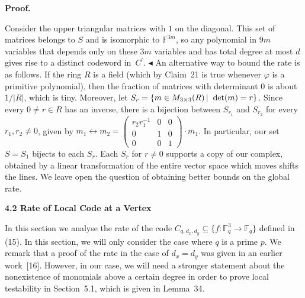 \documentclass[10pt,a4paper]{article}
\begin{document}



\par\medskip\noindent\textbf{Proof.}\par




Consider the upper triangular matrices with $1$ on the diagonal. This set of matrices belongs to $S$ and is isomorphic to $\mathbb{F}^{3m}$, so any polynomial in $9m$ variables that depends only on these $3m$ variables and has total degree at most $d$ gives rise to a distinct codeword in $C^{\prime}$.
$\blacktriangleleft$
An alternative way to bound the rate is as follows. If the ring $R$ is a field (which by Claim 21 is true whenever $\varphi$ is a primitive polynomial), then the fraction of matrices with determinant $0$ is about $1/|R|$, which is tiny. Moreover, let
$S_{r}=\left\{m\in M_{3\times 3}(R)\left|\;\vphantom{m\in M_{3\times 3}(R)\det(m)=r}\right.\det(m)=r\right\}$.
Since every $0\neq r\in R$ has an inverse, there is a bijection between $S_{r_{1}}$ and $S_{r_{2}}$ for every $r_{1},r_{2}\neq 0$, given by $m_{1}\leftrightarrow m_{2}=\begin{pmatrix}r_{2}r_{1}^{-1}&0&0\\
0&1&0\\
0&0&1\end{pmatrix}\cdot m_{1}$. In particular, our set $S=S_{1}$ bijects to each $S_{r}$.
Each $S_{r}$ for $r\neq 0$ supports a copy of our complex, obtained by a linear transformation of the entire vector space which moves shifts the lines.
We leave open the question of obtaining better bounds on the global rate.\par






\par\medskip\noindent\textbf{
4.2 Rate of Local Code at a Vertex}\par




In this section we analyse the rate of the code $C_{q,d_{x},d_{y}}\subseteq\{f:\mathbb{F}_{q}^{3}\to\mathbb{F}_{q}\}$ defined in (15). In this section, we will only consider the case where $q$ is a prime $p$. We remark that a proof of the rate in the case of $d_{x}=d_{y}$ was given in an earlier work [16]. However, in our case, we will need a stronger statement about the nonexistence of monomials above a certain degree in order to prove local testability in Section 5.1, which is given in Lemma 34.\par
\end{document}
